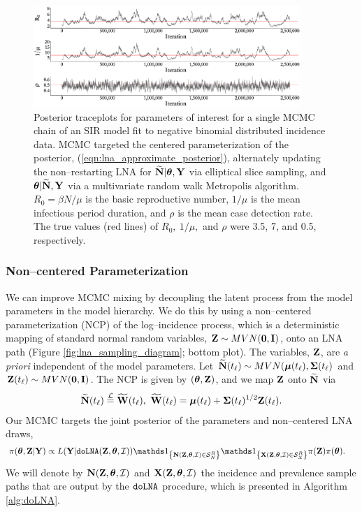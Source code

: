 \begin{figure}[!ht]
\centering
\includegraphics[width=0.9\textwidth]{figures/lna_centered_traces}
\caption[Traceplots for an MCMC chain using a centered LNA parameterization.]{Posterior traceplots for parameters of interest for a single MCMC chain of an SIR model fit to negative binomial distributed incidence data. MCMC targeted the centered parameterization of the posterior, (\ref{eqn:lna_approximate_posterior}), alternately updating the non--restarting LNA for $ \widetilde{\mathbf{N}}|\boldsymbol{\theta},\mathbf{Y} $ via elliptical slice sampling, and $ \boldsymbol{\theta}|\widetilde{\mathbf{N}},\mathbf{Y} $ via a multivariate random walk Metropolis algorithm. $ R_0 = \beta N / \mu$ is the basic reproductive number, $ 1/\mu $ is the mean infectious period duration, and $ \rho $ is the mean case detection rate. The true values (red lines) of $ R_0,\ 1/\mu,$ and $ \rho $ were 3.5, 7, and 0.5, respectively.}
\label{fig:lna_centered_traces}
\end{figure}

\subsubsection{Non--centered Parameterization}
\label{subsubsec:noncentered_parameterization}	

We can improve MCMC mixing by decoupling the latent process from the model parameters in the model hierarchy. We do this by using a non--centered parameterization (NCP) of the log--incidence process, which is a deterministic mapping of standard normal random variables, $ \mathbf{Z}\sim MVN(\boldsymbol{0},\mathbf{I}) $, onto an LNA path (Figure \ref{fig:lna_sampling_diagram}; bottom plot). The variables, $ \mathbf{Z} $, are \textit{a priori} independent of the model parameters. Let $ \widetilde{\mathbf{N}}(t_\ell)\sim MVN(\boldsymbol{\mu}(t_\ell),\boldsymbol{\Sigma}(t_\ell) $ and $ \mathbf{Z}(t_\ell)\sim MVN(\boldsymbol{0},\mathbf{I}) $. The NCP is given by $ (\boldsymbol{\theta},\mathbf{Z}) $, and we map $ \mathbf{Z} $ onto $ \widetilde{\mathbf{N}} $ via \begin{align}
\label{eqn:lna_ncp}
 \bNtil(t_\ell) \overset{\mcL}{=}\widetilde{\bW}(t_\ell),\ \widetilde{\bW}(t_\ell) = \bmu(t_\ell) + \bSigma(t_\ell)^{1/2}\bZ(t_\ell).
\end{align} 
Our MCMC targets the joint posterior of the parameters and non--centered LNA draws,
\begin{align}
\label{eqn:lna_noncentered_posterior}
\pi(\btheta,\bZ|\bY) &\propto L(\bY|\doLNA(\bZ,\btheta,\mcI))\ind{\bN(\bZ,\btheta,\mcI)\in\mcS_N^R}\ind{\bX(\bZ,\btheta,\mcI)\in\mcS_X^R}\pi(\bZ)\pi(\btheta).
\end{align}
We will denote by $ \mathbf{N}(\mathbf{Z},\boldsymbol{\theta},\mathcal{I}) $ and $ \mathbf{X}(\mathbf{Z},\boldsymbol{\theta},\mathcal{I}) $ the incidence and prevalence sample paths that are output by the $ \texttt{doLNA} $ procedure, which is presented in Algorithm \ref{alg:doLNA}. 

